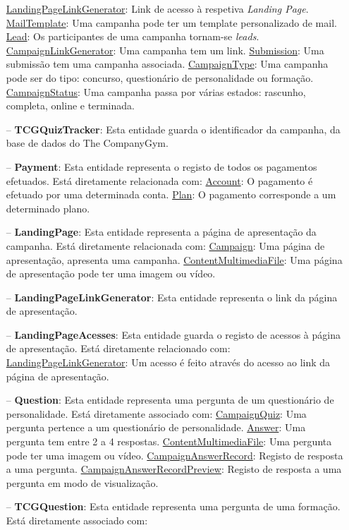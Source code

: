 \begin{itemize}
	\subitem \underline{LandingPageLinkGenerator}: Link de acesso à respetiva \textit{Landing Page}. 
	\subitem \underline{MailTemplate}: Uma campanha pode ter um template personalizado de mail.
	\subitem \underline{Lead}: Os participantes de uma campanha tornam-se \textit{leads}.
	\subitem \underline{CampaignLinkGenerator}: Uma campanha tem um link.
	\subitem \underline{Submission}: Uma submissão tem uma campanha associada.
	\subitem \underline{CampaignType}: Uma campanha pode ser do tipo: concurso, questionário de personalidade ou formação.
	\subitem \underline{CampaignStatus}: Uma campanha passa por várias estados: rascunho, completa, online e terminada.
	\item[--] \textbf{TCGQuizTracker}: Esta entidade guarda o identificador da campanha, da base de dados do The CompanyGym.
	\item[--] \textbf{Payment}: Esta entidade representa o registo de todos os pagamentos efetuados. Está diretamente relacionada com:
	\subitem \underline{Account}: O pagamento é efetuado por uma determinada conta.
	\subitem \underline{Plan}: O pagamento corresponde a um determinado plano.
	\item[--] \textbf{LandingPage}: Esta entidade representa a página de apresentação da campanha. Está diretamente relacionada com:
	\subitem \underline{Campaign}: Uma página de apresentação, apresenta uma campanha.
	\subitem \underline{ContentMultimediaFile}: Uma página de apresentação pode ter uma imagem ou vídeo.
	\item[--] \textbf{LandingPageLinkGenerator}: Esta entidade representa o link da página de apresentação. 
	\item[--] \textbf{LandingPageAcesses}: Esta entidade guarda o registo de acessos à página de apresentação. Está diretamente relacionado com:
	\subitem \underline{LandingPageLinkGenerator}: Um acesso é feito através do acesso ao link da página de apresentação.
	\item[--] \textbf{Question}: Esta entidade representa uma pergunta de um questionário de personalidade. Está diretamente associado com:
	\subitem \underline{CampaignQuiz}: Uma pergunta pertence a um questionário de personalidade.
	\subitem \underline{Answer}: Uma pergunta tem entre 2 a 4 respostas.
	\subitem \underline{ContentMultimediaFile}: Uma pergunta pode ter uma imagem ou vídeo.
	\subitem \underline{CampaignAnswerRecord}: Registo de resposta a uma pergunta.
	\subitem \underline{CampaignAnswerRecordPreview}: Registo de resposta a uma pergunta em modo de visualização.
	\item[--] \textbf{TCGQuestion}: Esta entidade representa uma pergunta de uma formação. Está diretamente associado com:

\end{itemize}

